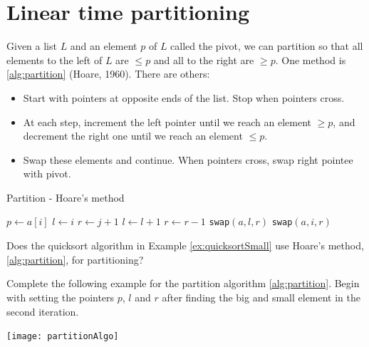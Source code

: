 \section{Linear time partitioning}
Given a list $L$ and an element $p$ of $L$ called the pivot, we can partition so
 that all elements to the left of $L$ are $\leq p$ and all to the right are 
$\geq p$. One method is \cref{alg:partition} (Hoare, 1960). There are others:
\begin{itemize}
\item Start with pointers at opposite ends of the list. Stop when pointers cross.
\item At each step, increment the left pointer until we reach an element $\geq p$, and decrement the right one until we reach an element $\leq p$. 
\item Swap these elements and continue. When pointers cross, swap right pointee with pivot.
\end{itemize}

\begin{algorithm}[H]
  \caption{Partition - Hoare's method}
    \label{alg:partition}
\begin{algorithmic}[0]
\State $p \gets a[i]$ 
\State $l \gets i $ 
\State $r \gets j+1$ 
\Repeat
\State $l\gets l+1 $ 
\Repeat
\State $r \gets r-1 $ 
\State \texttt{swap}$(a,l,r)$  
\Else
\State \texttt{swap}$(a,i,r)$  
\State {}
\EndIf
\EndWhile
\EndFunction  
\end{algorithmic}
\end{algorithm}

\begin{Boxample}[1]
Does the quicksort algorithm in Example \ref{ex:quicksortSmall} use Hoare's method, \cref{alg:partition}, for partitioning? 
\end{Boxample}

\begin{Boxample}[1]
Complete the following example for the partition algorithm \cref{alg:partition}. 
Begin with setting the pointers $p$, $l$ and $r$ after finding the big and small element in the second iteration.
\begin{center}
\texttt{[image: partitionAlgo]}
\end{center}
\end{Boxample}

